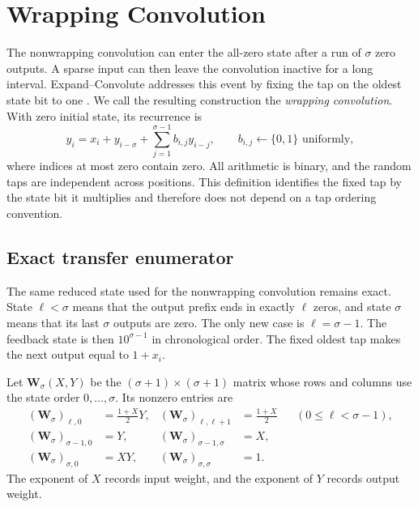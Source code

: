 

\section{Wrapping Convolution}

The nonwrapping convolution can enter the all-zero state after a run of
$\sigma$ zero outputs.  A sparse input can then leave the convolution inactive
for a long interval.  Expand--Convolute addresses this event by fixing the tap
on the oldest state bit to one \cite{EC}.  We call the resulting construction
the \emph{wrapping convolution}.  With zero initial state, its recurrence is
\begin{equation}
 y_i=x_i+y_{i-\sigma}
     +\sum_{j=1}^{\sigma-1}b_{i,j}y_{i-j},
 \qquad b_{i,j}\gets\{0,1\}\text{ uniformly},
 \label{eq:wrapping-recurrence}
\end{equation}
where indices at most zero contain zero.  All arithmetic is binary, and the
random taps are independent across positions.  This definition identifies the
fixed tap by the state bit it multiplies and therefore does not depend on a tap
ordering convention.

\subsection{Exact transfer enumerator}
\label{sec:wrapping-transfer-enumerator}

The same reduced state used for the nonwrapping convolution remains exact.
State $\ell<\sigma$ means that the output prefix ends in exactly $\ell$ zeros,
and state $\sigma$ means that its last $\sigma$ outputs are zero.  The only new
case is $\ell=\sigma-1$.  The feedback state is then
$10^{\sigma-1}$ in chronological order.  The fixed oldest tap makes the next
output equal to $1+x_i$.

Let $\mathbf W_\sigma(X,Y)$ be the $(\sigma+1)\times(\sigma+1)$ matrix whose
rows and columns use the state order $0,\ldots,\sigma$.  Its nonzero entries are
\begin{align}
 (\mathbf W_\sigma)_{\ell,0}
   &=\frac{1+X}{2}Y,
 &
 (\mathbf W_\sigma)_{\ell,\ell+1}
   &=\frac{1+X}{2}
 &&(0\leq\ell<\sigma-1),
 \label{eq:wrapping-bivariate-active}\\
 (\mathbf W_\sigma)_{\sigma-1,0}
   &=Y,
 &
 (\mathbf W_\sigma)_{\sigma-1,\sigma}
   &=X,
 \label{eq:wrapping-bivariate-critical}\\
 (\mathbf W_\sigma)_{\sigma,0}
   &=XY,
 &
 (\mathbf W_\sigma)_{\sigma,\sigma}
   &=1.
 \label{eq:wrapping-bivariate-zero}
\end{align}
The exponent of $X$ records input weight, and the exponent of $Y$ records
output weight.

